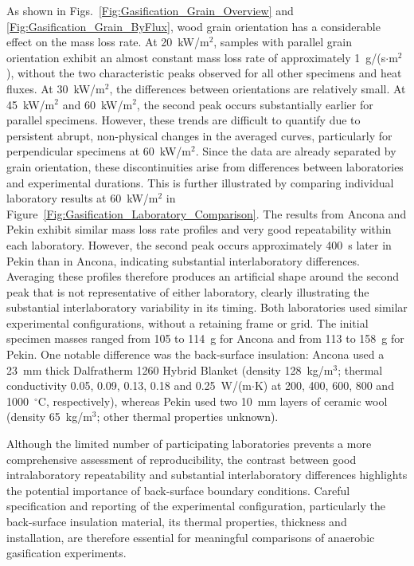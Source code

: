 \documentclass{book}
\begin{document}
As shown in Figs.~\ref{Fig:Gasification_Grain_Overview} and \ref{Fig:Gasification_Grain_ByFlux}, wood grain orientation has a considerable effect on the mass loss rate. At 20~kW/m$^2$, samples with parallel grain orientation exhibit an almost constant mass loss rate of approximately 1~g/(s$\cdot$m$^2$), without the two characteristic peaks observed for all other specimens and heat fluxes. At 30~kW/m$^2$, the differences between orientations are relatively small. At 45~kW/m$^2$ and 60~kW/m$^2$, the second peak occurs substantially earlier for parallel specimens. However, these trends are difficult to quantify due to persistent abrupt, non-physical changes in the averaged curves, particularly for perpendicular specimens at 60~kW/m$^2$. Since the data are already separated by grain orientation, these discontinuities arise from differences between laboratories and experimental durations. This is further illustrated by comparing individual laboratory results at 60~kW/m$^2$ in Figure~\ref{Fig:Gasification_Laboratory_Comparison}.
The results from Ancona and Pekin exhibit similar mass loss rate profiles and very good repeatability within each laboratory. However, the second peak occurs approximately 400~s later in Pekin than in Ancona, indicating substantial interlaboratory differences. Averaging these profiles therefore produces an artificial shape around the second peak that is not representative of either laboratory, clearly illustrating the substantial interlaboratory variability in its timing.
Both laboratories used similar experimental configurations, without a retaining frame or grid. The initial specimen masses ranged from 105 to 114~g for Ancona and from 113 to 158~g for Pekin. One notable difference was the back-surface insulation: Ancona used a 23~mm thick Dalfratherm 1260 Hybrid Blanket (density 128~kg/m$^3$; thermal conductivity 0.05, 0.09, 0.13, 0.18 and 0.25~W/(m$\cdot$K) at 200, 400, 600, 800 and 1000~$^\circ$C, respectively), whereas Pekin used two 10~mm layers of ceramic wool (density 65~kg/m$^3$; other thermal properties unknown).


Although the limited number of participating laboratories prevents a more comprehensive assessment of reproducibility, the contrast between good intralaboratory repeatability and substantial interlaboratory differences highlights the potential importance of back-surface boundary conditions. Careful specification and reporting of the experimental configuration, particularly the back-surface insulation material, its thermal properties, thickness and installation, are therefore essential for meaningful comparisons of anaerobic gasification experiments.
\end{document}
